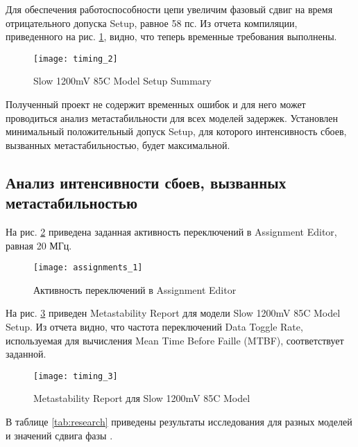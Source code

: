 Для обеспечения работоспособности цепи увеличим фазовый сдвиг на время отрицательного допуска Setup, равное 58 пс. Из отчета компиляции, приведенного на рис. \ref{fig:timing_2}, видно, что теперь временные требования выполнены. 

\begin{figure}[H]
	\begin{center}
		\texttt{[image: timing\_2]}
		\caption{Slow 1200mV 85C Model Setup Summary}
		\label{fig:timing_2}
	\end{center}
\end{figure}

Полученный проект не содержит временных ошибок и для него может проводиться анализ метастабильности для всех моделей задержек. Установлен минимальный положительный допуск Setup, для которого интенсивность сбоев, вызванных метастабильностью, будет максимальной.

\newpage

\subsection{Анализ интенсивности сбоев, вызванных метастабильностью}

На рис. \ref{fig:assignments_1} приведена заданная активность переключений в Assignment Editor, равная 20 МГц.

\begin{figure}[H]
	\begin{center}
		\texttt{[image: assignments\_1]}
		\caption{Активность переключений в Assignment Editor}
		\label{fig:assignments_1}
	\end{center}
\end{figure}

На рис. \ref{fig:timing_3} приведен Metastability Report для модели Slow 1200mV 85C Model Setup. Из отчета видно, что частота переключений Data Toggle Rate, используемая для вычисления Mean Time Before Faille (MTBF), соответствует заданной.

\begin{figure}[H]
	\begin{center}
		\texttt{[image: timing\_3]}
		\caption{Metastability Report для Slow 1200mV 85C Model}
		\label{fig:timing_3}
	\end{center}
\end{figure}

В таблице \ref{tab:research} приведены результаты исследования для разных моделей и значений сдвига фазы .

